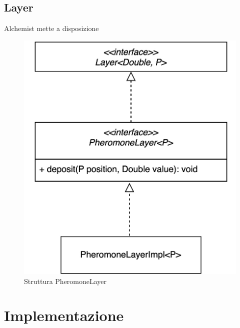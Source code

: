 \documentclass[12pt,a4paper,openright,twoside]{book}
\begin{document}
\section{Layer}
Alchemist mette a disposizione 
\begin{figure}
    \centering
    \includegraphics[width=.8\linewidth]{figures/pheromoneLayer.jpeg}
    \caption{Struttura PheromoneLayer}
    \label{fig:phLayer}
\end{figure}

%

\chapter{Implementazione}



\backmatter

\nocite{*} %



\end{document}
